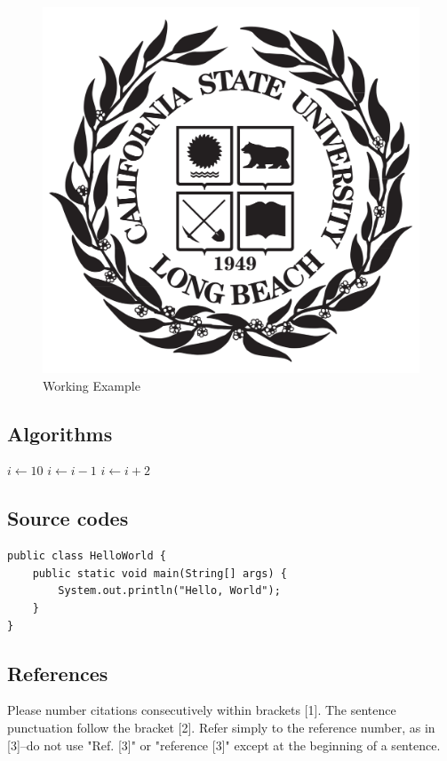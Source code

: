 \documentclass{article}
\begin{document}
\begin{figure}[h]
    \centering
    \includegraphics[scale=0.1]{fig1.png}
    \caption{Working Example}
    \label{fig:my_label}
\end{figure}

\newpage
\subsection{Algorithms}
\begin{algorithmic}
\STATE $i\gets 10$
        \STATE $i\gets i-1$
\ELSE
                \STATE $i\gets i+2$
        \ENDIF
\ENDIF
\end{algorithmic}

\subsection{Source codes}
\begin{verbatim}
public class HelloWorld {
    public static void main(String[] args) {
        System.out.println("Hello, World");
    }
}
\end{verbatim}

\subsection{References}
Please number citations consecutively within brackets [1]. The sentence punctuation follow the bracket [2]. Refer simply to the reference number, as in [3]--do not use "Ref. [3]" or "reference [3]" except at the beginning of a sentence.
\end{document}
